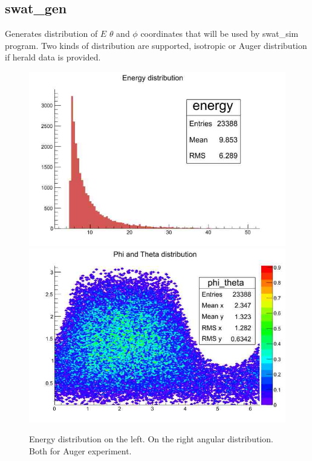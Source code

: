 \documentclass[12pt]{article}
\begin{document}
\subsection{swat\_gen}
Generates distribution of $E$ $\theta$ and $\phi$ coordinates that
will be used by swat\_sim program. Two kinds of distribution are
supported, isotropic or Auger distribution if herald data is provided.
\begin{figure}[ht]
   \centering
      \includegraphics[scale=0.25]{energy.jpg}
      \includegraphics[scale=0.25]{phi_theta.jpg}
   \caption{Energy distribution on the left. On the right
   angular distribution. Both for Auger experiment.}
   \label{healpix}
\end{figure}
\end{document}

